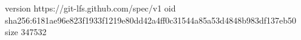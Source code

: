 version https://git-lfs.github.com/spec/v1
oid sha256:6181ae96e823f1933f1219e80dd42a4ff0c31544a85a53d4848b983df137eb50
size 347532
